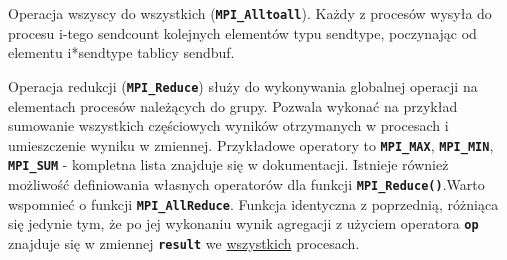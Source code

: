 Operacja wszyscy do wszystkich (\texttt{\textbf{MPI\_Alltoall}}). Każdy z procesów wysyła do procesu i-tego sendcount kolejnych elementów typu sendtype, poczynając od elementu i*sendtype tablicy sendbuf.
 
Operacja redukcji (\texttt{\textbf{MPI\_Reduce}}) służy do wykonywania globalnej operacji na elementach procesów należących do grupy. Pozwala wykonać na przykład sumowanie wszystkich częściowych wyników otrzymanych w procesach i umieszczenie wyniku w zmiennej. Przykładowe operatory to \texttt{\textbf{MPI\_MAX}}, \texttt{\textbf{MPI\_MIN}}, \texttt{\textbf{MPI\_SUM}} - kompletna lista znajduje się w dokumentacji. Istnieje również możliwość definiowania własnych operatorów dla funkcji \texttt{\textbf{MPI\_Reduce()}}.Warto wspomnieć o funkcji \texttt{\textbf{MPI\_AllReduce}}. Funkcja identyczna z poprzednią, różniąca się jedynie tym, że po jej wykonaniu wynik agregacji z użyciem operatora \texttt{\textbf{op}} znajduje się w zmiennej \texttt{\textbf{result}} we \underline{wszystkich} procesach.
